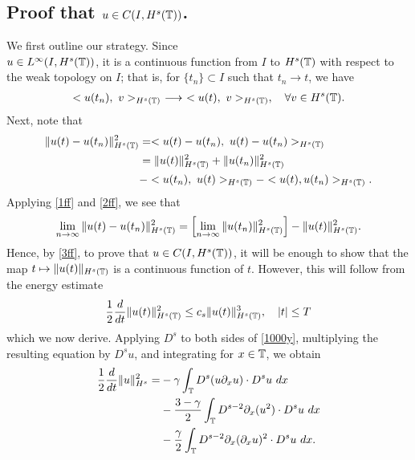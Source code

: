 \subsection{Proof that $u \in C(I, H^s(\mathbb{T}))$.} 
We first outline our strategy. Since \\
$u \in L^\infty(I, H^s(\mathbb{T}))$, it is a
continuous function from $I$ to $H^s(\mathbb{T})$ with respect to the weak
topology on $I$; that is, for $\{t_n\} \subset I$ such that $t_n \to t$, we
have
\begin{equation}
\begin{split}
<u(t_n), \ v>_{H^s(\mathbb{T})} \ \longrightarrow \
<u(t), \ v>_{H^s(\mathbb{T})}, \quad \forall
v \in H^s(\mathbb{T}).
\label{1ff}
\end{split}
\end{equation}
Next, note that
\begin{equation}
\begin{split}
\|u(t) - u(t_n) \|_{H^s(\mathbb{T})}^2
& = <u(t) - u(t_n), \ u(t) -
u(t_n)>_{H^s(\mathbb{T})}
\\
& = \|u(t)\|_{H^s(\mathbb{T})}^2 + \|u(t_n)\|_{H^s(\mathbb{T})}^2
\\
& - <u(t_n), \
u(t) >_{H^s(\mathbb{T})} - <u(t), u(t_n)>_{H^s(\mathbb{T})}.
\label{2ff}
\end{split}
\end{equation}
Applying \eqref{1ff} and \eqref{2ff}, we see that
\begin{equation}
\begin{split}
\lim_{n \to \infty} \|u(t) - u(t_n)\|_{H^s(\mathbb{T})}^2 = \left[ \lim_{n
\to \infty} \|u(t_n)\|_{H^s(\mathbb{T})}^2
\right] - \|u(t)\|_{H^s(\mathbb{T})}^2.
\label{3ff}
\end{split}
\end{equation}
Hence, by \eqref{3ff}, to prove that $u \in C(I, H^s(\mathbb{T}))$, it will be
enough to show that the map $t \mapsto \|u(t)\|_{H^s(\mathbb{T})}$ is a continuous
function of $t$. However, this will follow from the energy
estimate
\begin{equation}
\label{en-est-u}
\frac{1}{2} \frac{d}{dt} \|u(t)\|_{H^s(\mathbb{T})}^2
\le c_s \|u(t)\|_{H^s(\mathbb{T})}^3, \quad |t| \le T
\end{equation}
which we now derive. Applying $D^s$ to both sides of
\eqref{1000y}, multiplying the
resulting equation by $D^s u$, and integrating for $x\in \mathbb{T}$, we obtain
\begin{equation}
\begin{split}
\label{bound-int}
\frac 12
\frac{d}{dt} \|u \|_{H^s}^2
=
&-
\gamma \int_{\mathbb{T}}   D^s (u \partial_x u) \cdot
D^s u \  dx
\\
&- \frac{3 -\gamma}{2} \int_{\mathbb{T}}  D^{s-2} \partial_x (u^2) 
\cdot D^s u \ dx
\\
&- \frac{\gamma}{2} \int_{\mathbb{T}}   D^{s-2} \partial_x (\partial_x u)^2
\cdot D^s u \ dx.
\end{split}
\end{equation}
